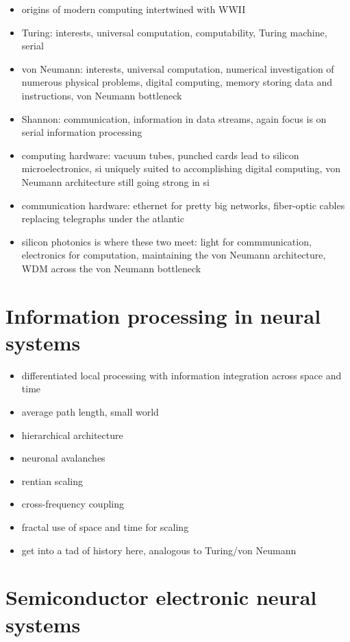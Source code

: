 \documentclass[twocolumn]{article}
\begin{document}
\begin{itemize}
\item origins of modern computing intertwined with WWII
\item Turing: interests, universal computation, computability, Turing machine, serial
\item von Neumann: interests, universal computation, numerical investigation of numerous physical problems, digital computing, memory storing data and instructions, von Neumann bottleneck
\item Shannon: communication, information in data streams, again focus is on serial information processing
\item computing hardware: vacuum tubes, punched cards lead to silicon microelectronics, si uniquely suited to accomplishing digital computing, von Neumann architecture still going strong in si
\item communication hardware: ethernet for pretty big networks, fiber-optic cables replacing telegraphs under the atlantic
\item silicon photonics is where these two meet: light for commmunication, electronics for computation, maintaining the von Neumann architecture, WDM across the von Neumann bottleneck
\end{itemize}

\cite{tu1936}
\cite{ne1945}
\cite{sh1948}

\section{\label{sec:neuroscience}Information processing in neural systems}

\begin{itemize}
\item differentiated local processing with information integration across space and time
\item average path length, small world
\item hierarchical architecture
\item neuronal avalanches
\item rentian scaling
\item cross-frequency coupling
\item fractal use of space and time for scaling
\item get into a tad of history here, analogous to Turing/von Neumann
\end{itemize}

\section{\label{sec:electronics}Semiconductor electronic neural systems}
\end{document}
